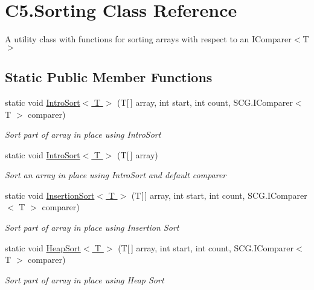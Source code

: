 \hypertarget{class_c5_1_1_sorting}{}\section{C5.\+Sorting Class Reference}
\label{class_c5_1_1_sorting}


A utility class with functions for sorting arrays with respect to an I\+Comparer$<$T$>$  


\subsection*{Static Public Member Functions}
\begin{DoxyCompactItemize}
\item 
static void \hyperlink{class_c5_1_1_sorting_a4f62536eb43d19c31d6d213294d970af}{Intro\+Sort$<$ T $>$} (T\mbox{[}$\,$\mbox{]} array, int start, int count, S\+C\+G.\+I\+Comparer$<$ T $>$ comparer)
\begin{DoxyCompactList}\small\item\em Sort part of array in place using Intro\+Sort \end{DoxyCompactList}\item 
static void \hyperlink{class_c5_1_1_sorting_ac6e93a2563bca70f6cb55fa310253f61}{Intro\+Sort$<$ T $>$} (T\mbox{[}$\,$\mbox{]} array)
\begin{DoxyCompactList}\small\item\em Sort an array in place using Intro\+Sort and default comparer \end{DoxyCompactList}\item 
static void \hyperlink{class_c5_1_1_sorting_a6061f6c468e0fa8574aca652771f2f4a}{Insertion\+Sort$<$ T $>$} (T\mbox{[}$\,$\mbox{]} array, int start, int count, S\+C\+G.\+I\+Comparer$<$ T $>$ comparer)
\begin{DoxyCompactList}\small\item\em Sort part of array in place using Insertion Sort \end{DoxyCompactList}\item 
static void \hyperlink{class_c5_1_1_sorting_a7f241abf0b6d6feae8f058684d3e59e4}{Heap\+Sort$<$ T $>$} (T\mbox{[}$\,$\mbox{]} array, int start, int count, S\+C\+G.\+I\+Comparer$<$ T $>$ comparer)
\begin{DoxyCompactList}\small\item\em Sort part of array in place using Heap Sort \end{DoxyCompactList}\end{DoxyCompactItemize}


